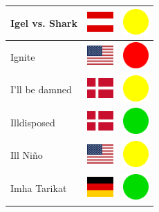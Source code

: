 \documentclass[12pt, a4paper, twoside]{report}
\begin{document}
\begin{center}
\begin{longtable}{|p{5cm}|p{2cm}|p{2cm}|}
 Igel vs. Shark                                             & \includegraphics[width=1cm]{../img/flags/at} &   \includegraphics[width=1cm]{../likes/m} \\ \hline
 Ignite                                                     & \includegraphics[width=1cm]{../img/flags/us} &   \includegraphics[width=1cm]{../likes/n} \\ \hline
 I'll be damned                                             & \includegraphics[width=1cm]{../img/flags/dk} &   \includegraphics[width=1cm]{../likes/m} \\ \hline
 Illdisposed                                                & \includegraphics[width=1cm]{../img/flags/dk} &   \includegraphics[width=1cm]{../likes/y} \\ \hline
 Ill Niño                                                   & \includegraphics[width=1cm]{../img/flags/us} &   \includegraphics[width=1cm]{../likes/m} \\ \hline
 Imha Tarikat                                               & \includegraphics[width=1cm]{../img/flags/de} &   \includegraphics[width=1cm]{../likes/y} \\ \hline

\end{longtable}
\end{center}
\end{document}
